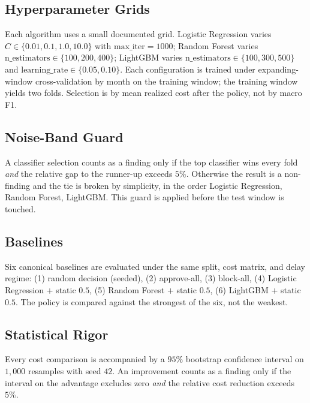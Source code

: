 \documentclass[conference]{IEEEtran}
\begin{document}
\subsection{Hyperparameter Grids}

Each algorithm uses a small documented grid. Logistic Regression varies $C
\in \{0.01, 0.1, 1.0, 10.0\}$ with $\text{max\_iter} = 1000$; Random Forest
varies $\text{n\_estimators} \in \{100, 200, 400\}$; LightGBM varies
$\text{n\_estimators} \in \{100, 300, 500\}$ and $\text{learning\_rate} \in
\{0.05, 0.10\}$. Each configuration is trained under expanding-window
cross-validation by month on the training window; the training window
yields two folds. Selection is by mean realized cost after the policy, not
by macro F1.

\subsection{Noise-Band Guard}

A classifier selection counts as a finding only if the top classifier wins
every fold \emph{and} the relative gap to the runner-up exceeds $5\%$.
Otherwise the result is a non-finding and the tie is broken by simplicity,
in the order Logistic Regression, Random Forest, LightGBM. This guard is
applied before the test window is touched.

\subsection{Baselines}

Six canonical baselines are evaluated under the same split, cost matrix,
and delay regime: (1) random decision (seeded), (2) approve-all, (3)
block-all, (4) Logistic Regression $+$ static $0.5$, (5) Random Forest $+$
static $0.5$, (6) LightGBM $+$ static $0.5$. The policy is compared against
the strongest of the six, not the weakest.

\subsection{Statistical Rigor}

Every cost comparison is accompanied by a $95\%$ bootstrap confidence
interval on $1{,}000$ resamples with seed $42$. An improvement counts as a
finding only if the interval on the advantage excludes zero \emph{and} the
relative cost reduction exceeds $5\%$.

\end{document}
